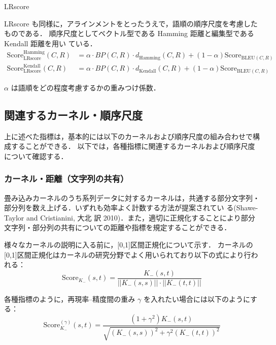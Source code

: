 \documentclass[japanese]{jnlp_1.4}
\renewcommand{\paragraph}{}
\begin{document}
\paragraph{LRscore}
\label{para:LRscore}

LRscore \cite{Birch-2010}も同様に，アラインメントをとったうえで，語順の順序尺度を考慮したものである．
順序尺度としてベクトル型である Hamming 距離と編集型である Kendall 距離を用い
ている．
\begin{align*}
 \mbox{Score}^{\mbox{Hamming}}_{\mbox{LRscore}}(C,R)
  & = \alpha \cdot BP(C,R) \cdot d_{\mbox{Hamming}}(C,R) + (1 - \alpha) \mbox{Score}_{\mbox{BLEU}(C,R)} \\[1.5ex]
 \mbox{Score}^{\mbox{Kendall}}_{\mbox{LRscore}}(C,R)
  & = \alpha \cdot BP(C,R) \cdot d_{\mbox{Kendall}}(C,R) +  (1 - \alpha) \mbox{Score}_{\mbox{BLEU}(C,R)}
\end{align*}

$\alpha$ は語順をどの程度考慮するかの重みつけ係数．



\subsection{関連するカーネル・順序尺度}

上に述べた指標は，基本的には以下のカーネルおよび順序尺度の組み合わせで構
成することができる．
以下では，各種指標に関連するカーネルおよび順序尺度について確認する．


\subsubsection{カーネル・距離（文字列の共有）}

畳み込みカーネルのうち系列データに対するカーネルは，共通する部分文字列・部分列を数え上げる．いずれも効率よく計数する方法が提案されてい
    る(Shawe-Taylor and Cristianini, 大北 訳 2010)\nocite{Taylor-2010}．また，適切に正規化することにより部分文字列・部分列の共有についての距離や指標を規定することができる．


様々なカーネルの説明に入る前に，[0,1]区間正規化について示す．
カーネルの[0,1]区間正規化はカーネルの研究分野でよく用いられており以下の式により行われる：
\[
\mbox{Score}_{K_{-}}(s,t) = \frac{K_{-}(s,t)}{||K_{-}(s,s)|| \cdot ||K_{-}(t,t)||}
\]

各種指標のように，再現率--精度間の重み $\gamma$ を入れたい場合には以下のようにする：
\[
\mbox{Score}^{(\gamma)}_{K_{-}}(s,t) = \frac{(1 + \gamma^{2})K_{-}(s,t)}{\sqrt{(K_{-}(s,s))^{2} + \gamma^{2} (K_{-}(t,t))^{2}}}
\]
\end{document}
